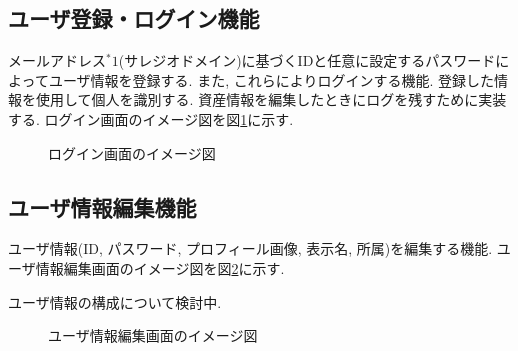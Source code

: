 \documentclass[11ptm]{jsarticle}
\begin{document}
\clearpage
\subsection{ユーザ登録・ログイン機能}
\label{subsec:ユーザ登録・ログイン機能}
メールアドレス$^*1$(サレジオドメイン)に基づくIDと任意に設定するパスワードによってユーザ情報を登録する. また, これらによりログインする機能. 登録した情報を使用して個人を識別する. 資産情報を編集したときにログを残すために実装する. ログイン画面のイメージ図を図\ref{fig:ログイン画面のイメージ図}に示す. 
\begin{figure}[h]
  \centering
  \caption{\label{fig:ログイン画面のイメージ図}ログイン画面のイメージ図}
\end{figure}

\clearpage
\subsection{ユーザ情報編集機能}
\label{subsec:ユーザ情報編集機能}
ユーザ情報(ID, パスワード, プロフィール画像, 表示名, 所属)を編集する機能. ユーザ情報編集画面のイメージ図を図\ref{fig:ユーザ情報編集画面のイメージ図}に示す. \par
ユーザ情報の構成について検討中.
\begin{figure}[h]
  \centering
  \caption{\label{fig:ユーザ情報編集画面のイメージ図}ユーザ情報編集画面のイメージ図}
\end{figure}
\end{document}
